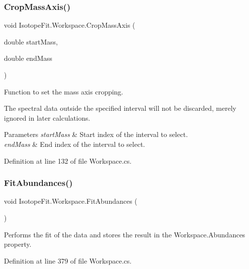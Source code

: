 \subsubsection{\texorpdfstring{Crop\+Mass\+Axis()}{CropMassAxis()}}
{\footnotesize\ttfamily void Isotope\+Fit.\+Workspace.\+Crop\+Mass\+Axis (\begin{DoxyParamCaption}\item[{double}]{start\+Mass,  }\item[{double}]{end\+Mass }\end{DoxyParamCaption})}



Function to set the mass axis cropping. 

The spectral data outside the specified interval will not be discarded, merely ignored in later calculations.


\begin{DoxyParams}{Parameters}
{\em start\+Mass} & Start index of the interval to select.\\
\hline
{\em end\+Mass} & End index of the interval to select.\\
\hline
\end{DoxyParams}


Definition at line 132 of file Workspace.\+cs.

\mbox{\label{class_isotope_fit_1_1_workspace_a40fa9b2c0b5d31feae1093d08b1aad52}} 
\subsubsection{\texorpdfstring{Fit\+Abundances()}{FitAbundances()}}
{\footnotesize\ttfamily void Isotope\+Fit.\+Workspace.\+Fit\+Abundances (\begin{DoxyParamCaption}{ }\end{DoxyParamCaption})}



Performs the fit of the data and stores the result in the Workspace.\+Abundances property. 



Definition at line 379 of file Workspace.\+cs.

\mbox{\label{class_isotope_fit_1_1_workspace_a80f09325539d16dd9eee6b470316db8b}} 
